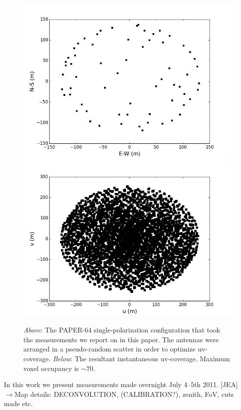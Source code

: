\documentclass[useAMS,usenatbib]{mn2e}
\begin{document}
\begin{figure}
\includegraphics[width=\columnwidth]{psa64imageconfig.png}
\includegraphics[width=\columnwidth]{psa64uvcoverage.png}
\caption{\textit{Above}: The PAPER-64 single-polarization configuration that took the measurements we report on in this paper. The antennae were arranged in a pseudo-random scatter in order to optimize uv-coverage. \textit{Below}: The resultant instantaneous uv-coverage. Maximum voxel occupancy is $\sim70$.}
\label{fig:config}
\end{figure}

In this work we present measurements made overnight July 4--5th 2011.
{\color{blue}[JEA] $\rightarrow$}Map details: DECONVOLUTION, (CALIBRATION?), zenith, FoV, cuts made etc.
\end{document}
